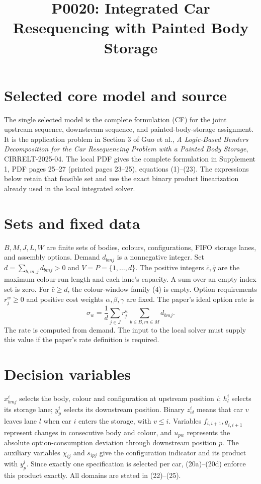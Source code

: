 \documentclass[10pt,a4paper]{article}
\title{P0020: Integrated Car Resequencing with Painted Body Storage}
\date{}
\begin{document}
\maketitle

\section*{Selected core model and source}
The single selected model is the complete formulation (CF) for the joint
upstream sequence, downstream sequence, and painted-body-storage assignment.
It is the application problem in Section 3 of Guo et al.,
\emph{A Logic-Based Benders Decomposition for the Car Resequencing Problem
with a Painted Body Storage}, CIRRELT-2025-04.
The local PDF gives the complete formulation in Supplement 1,
PDF pages 25--27 (printed pages 23--25), equations (1)--(23).
The expressions below retain that feasible set and use the exact binary
product linearization already used in the local integrated solver.


\section*{Sets and fixed data}
$B,M,J,L,W$ are finite sets of bodies, colours, configurations, FIFO storage
lanes, and assembly options. Demand $d_{bmj}$ is a nonnegative integer.
Set $d=\sum_{b,m,j}d_{bmj}>0$ and $V=P=\{1,\ldots,d\}$.
The positive integers $\bar c,\bar q$ are the maximum colour-run length
and each lane's capacity. A sum over an empty index set is zero.
For $\bar c\ge d$, the colour-window family (4) is empty.
Option requirements $r_j^w\ge0$ and positive cost weights
$\alpha,\beta,\gamma$ are fixed. The paper's ideal option rate is
\[
 \sigma_w=\frac{1}{d}\sum_{j\in J}r_j^w
                  \sum_{b\in B,m\in M}d_{bmj}.
\]
The rate is computed from demand. The input to the local
solver must supply this value if the paper's rate definition is required.

\section*{Decision variables}
$x_{bmj}^i$ selects the body, colour and configuration at upstream position
$i$; $h_l^i$ selects its storage lane; $y_p^i$ selects its downstream
position. Binary $z_{vl}^i$ means that car $v$ leaves lane $l$ when car $i$
enters the storage, with $v\le i$. Variables $f_{i,i+1},g_{i,i+1}$
represent changes in consecutive body and colour, and $u_{pw}$ represents
the absolute option-consumption deviation through downstream position $p$.
The auxiliary variables $\chi_{ij}$ and $s_{ipj}$ give the configuration
indicator and its product with $y_p^i$. Since exactly one specification is
selected per car, (20a)--(20d) enforce this product exactly.
All domains are stated in (22)--(25).
\end{document}
